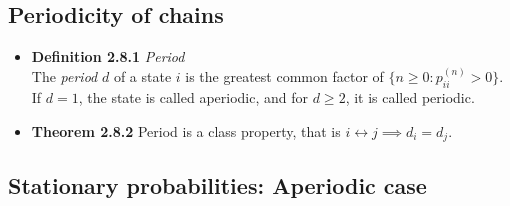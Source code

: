 \documentclass[11pt,a4paper]{article}
\begin{document}
\subsection{Periodicity of chains}

\begin{itemize}

    \item \textbf{Definition 2.8.1} \emph{Period} \\
        The \emph{period} $d$ of a state $i$ is the greatest common factor of
        $\{ n \geq 0 : p_{ii}^{(n)} > 0 \}$.
        If $d=1$, the state is called aperiodic, and for $d \geq 2$, it is called periodic.

    \item \textbf{Theorem 2.8.2} Period is a class property, that is
        $i \leftrightarrow j \implies d_i = d_j$.

\end{itemize}

\subsection{Stationary probabilities: Aperiodic case}
\end{document}
